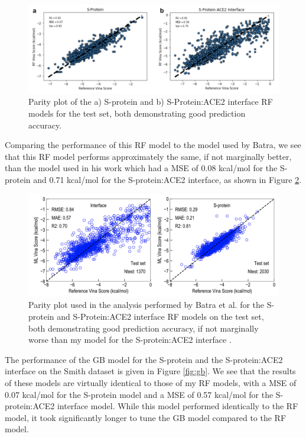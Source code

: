 \documentclass[11pt]{article}
\begin{document}
   \begin{figure}
     \centering
     \includegraphics[width=160mm]{rf}
     \caption{Parity plot of the a) S-protein and b) S-Protein:ACE2 interface RF models for the test set, both demonstrating good prediction accuracy.}
     \label{fig:rf}
   \end{figure} 
  
  Comparing the performance of this RF model to the model used by Batra, we see that this RF model performs approximately the same, if not marginally better, than the model used in his work which had a MSE of 0.08 kcal/mol for the S-protein and 0.71 kcal/mol for the S-protein:ACE2 interface, as shown in Figure \ref{fig:batraRF}.
  
   \begin{figure}
     \centering
     \includegraphics[width=160mm]{batraRF}
     \caption{Parity plot used in the analysis performed by Batra et al. for the S-protein and S-Protein:ACE2 interface RF models on the test set, both demonstrating good prediction accuracy, if not marginally worse than my model for the S-protein:ACE2 interface \cite{smith}.}
     \label{fig:batraRF}
   \end{figure} 
   
   The performance of the GB model for the S-protein and the S-protein:ACE2 interface on the Smith dataset is given in Figure \ref{fig:gb}. We see that the results of these models are virtually identical to those of my RF models, with a MSE of 0.07 kcal/mol for the S-protein model and a MSE of 0.57 kcal/mol for the S-protein:ACE2 interface model. While this model performed identically to the RF model, it took significantly longer to tune the GB model compared to the RF model.
   
\end{document}
